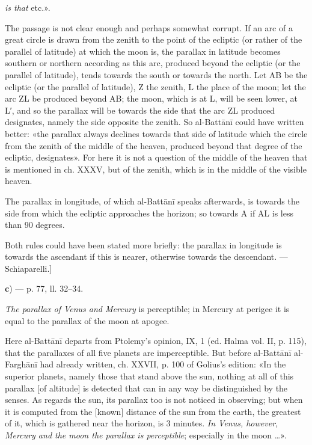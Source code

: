 \documentclass[11pt]{article}
\newcommand{\Pg}[1]{\marginpar{\footnotesize\color{gray}#1}}
\begin{document}
\par [«\emph{The parallax always declines towards the side of latitude in which the degree} [\emph{of the ecliptic}] \emph{is that} etc.».\par
\begin{center}\end{center}
\par \Pg{I 252}The passage is not clear enough and perhaps somewhat corrupt. If an arc of a great circle is drawn from the zenith to the point of the ecliptic (or rather of the parallel of latitude) at which the moon is, the parallax in latitude becomes southern or northern according as this arc, produced beyond the ecliptic (or the parallel of latitude), tends towards the south or towards the north. Let AB be the ecliptic (or the parallel of latitude), Z the zenith, L the place of the moon; let the arc ZL be produced beyond AB; the moon, which is at L, will be seen lower, at L′, and so the parallax will be towards the side that the arc ZL produced designates, namely the side opposite the zenith. So al-Battānī could have written better: «the parallax always declines towards that side of latitude which the circle from the zenith of the middle of the heaven, produced beyond that degree of the ecliptic, designates». For here it is not a question of the middle of the heaven that is mentioned in ch. XXXV, but of the zenith, which is in the middle of the visible heaven.\par
\par The parallax in longitude, of which al-Battānī speaks afterwards, is towards the side from which the ecliptic approaches the horizon; so towards A if AL is less than 90 degrees.\par
\par Both rules could have been stated more briefly: the parallax in longitude is towards the ascendant if this is nearer, otherwise towards the descendant. — Schiaparelli.]\par
\par\begin{center}\textbf{c}) — p. 77, ll. 32–34.\end{center}
\par \emph{The parallax of Venus and Mercury} is perceptible; in Mercury at perigee it is equal to the parallax of the moon at apogee.\par
\par Here al-Battānī departs from Ptolemy's opinion, IX, 1 (ed. Halma vol. II, p. 115), that the parallaxes of all five planets are imperceptible. But before al-Battānī al-Farghānī had already written, ch. XXVII, p. 100 of Golius's edition: «In the superior planets, namely those that stand above the sun, nothing at all of this parallax [of altitude] is detected that can in any way be distinguished by the senses. As regards the sun, its parallax too is not noticed in observing; but when it is computed from the [known] distance of the sun from the earth, the greatest of it, which is gathered near the horizon, is 3 minutes. \emph{In Venus, however, Mercury and the moon the parallax is perceptible}; especially in the moon …».\par
\end{document}
